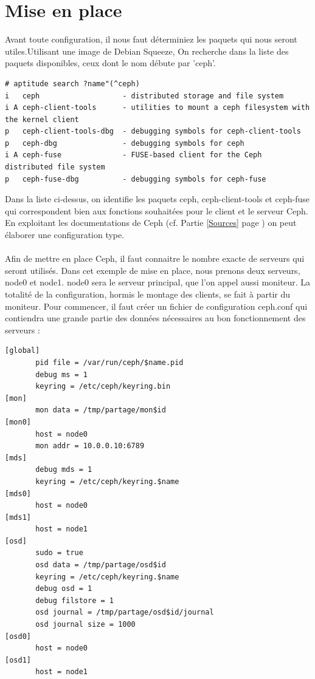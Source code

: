 \documentclass[12pt]{report}
\begin{document}
		        \section{Mise en place}
		                       Avant toute configuration, il nous faut déterminiez les paquets qui nous seront utiles.Utilisant une image de Debian Squeeze, On recherche dans la liste des paquets disponibles, ceux dont le nom débute par 'ceph'.
		                       \begin{lstlisting}
# aptitude search ?name"(^ceph)
i   ceph                   - distributed storage and file system                                         
i A ceph-client-tools      - utilities to mount a ceph filesystem with the kernel client                 
p   ceph-client-tools-dbg  - debugging symbols for ceph-client-tools                                     
p   ceph-dbg               - debugging symbols for ceph                                                  
i A ceph-fuse              - FUSE-based client for the Ceph distributed file system                      
p   ceph-fuse-dbg          - debugging symbols for ceph-fuse
                           \end{lstlisting}	        
                           Dans la liste ci-dessus, on identifie les paquets ceph, ceph-client-tools et ceph-fuse qui correspondent bien aux fonctions souhaitées pour le client et le serveur Ceph.
En exploitant les documentations de Ceph (cf. Partie \ref{Sources} page \pageref{Sources}) on peut élaborer une configuration type.\\\\       
		                       Afin de mettre en place Ceph, il faut connaitre le nombre exacte de serveurs qui seront utilisés. Dans cet exemple de mise en place, nous prenons deux serveurs, node0 et node1. node0 sera le serveur principal, que l'on appel aussi moniteur. La totalité de la configuration, hormis le montage des clients, se fait à partir du moniteur. Pour commencer, il faut créer un fichier de configuration ceph.conf qui contiendra une grande partie des données nécessaires au bon fonctionnement des serveurs :
		           \begin{lstlisting}
[global]
       pid file = /var/run/ceph/$name.pid
       debug ms = 1
       keyring = /etc/ceph/keyring.bin
[mon]
       mon data = /tmp/partage/mon$id
[mon0]
       host = node0
       mon addr = 10.0.0.10:6789
[mds]
       debug mds = 1
       keyring = /etc/ceph/keyring.$name
[mds0]
       host = node0
[mds1]
       host = node1
[osd]
       sudo = true
       osd data = /tmp/partage/osd$id
       keyring = /etc/ceph/keyring.$name
       debug osd = 1
       debug filstore = 1
       osd journal = /tmp/partage/osd$id/journal
       osd journal size = 1000
[osd0]
       host = node0
[osd1]
       host = node1

		           \end{lstlisting}           
\end{document}

